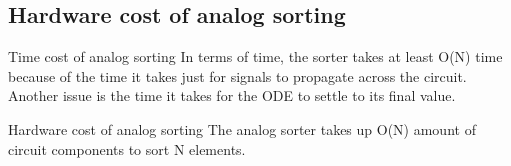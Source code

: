 \subsection{Hardware cost of analog sorting}
Time cost of analog sorting
	In terms of time, the sorter takes at least O(N) time because of the time it takes just for signals to propagate across the circuit.
	Another issue is the time it takes for the ODE to settle to its final value.

Hardware cost of analog sorting
The analog sorter takes up O(N) amount of circuit components to sort N elements.












